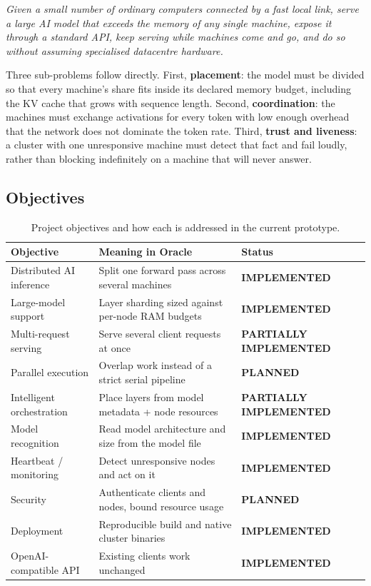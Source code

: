 \documentclass[11pt,a4paper]{article}
\newcommand{\stImp}{\textcolor{ogreen}{\footnotesize\textsf{\textbf{IMPLEMENTED}}}}
\newcommand{\stPart}{\textcolor{oamber}{\footnotesize\textsf{\textbf{PARTIALLY IMPLEMENTED}}}}
\newcommand{\stPlan}{\textcolor{oblue}{\footnotesize\textsf{\textbf{PLANNED}}}}
\begin{document}
\emph{Given a small number of ordinary computers connected by a fast local link,
serve a large AI model that exceeds the memory of any single machine, expose it
through a standard API, keep serving while machines come and go, and do so
without assuming specialised datacentre hardware.}

Three sub-problems follow directly. First, \textbf{placement}: the model must be
divided so that every machine's share fits inside its declared memory budget,
including the KV cache that grows with sequence length. Second,
\textbf{coordination}: the machines must exchange activations for every token
with low enough overhead that the network does not dominate the token rate.
Third, \textbf{trust and liveness}: a cluster with one unresponsive machine must
detect that fact and fail loudly, rather than blocking indefinitely on a machine
that will never answer.

\subsection{Objectives}

\begin{table}[h]
\centering
\caption{Project objectives and how each is addressed in the current prototype.}
\label{tab:objectives}
\footnotesize
\begin{tabularx}{\textwidth}{@{}l X l@{}}
\toprule
\textbf{Objective} & \textbf{Meaning in Oracle} & \textbf{Status} \\
\midrule
Distributed AI inference & Split one forward pass across several machines & \stImp \\
Large-model support & Layer sharding sized against per-node RAM budgets & \stImp \\
Multi-request serving & Serve several client requests at once & \stPart \\
Parallel execution & Overlap work instead of a strict serial pipeline & \stPlan \\
Intelligent orchestration & Place layers from model metadata + node resources & \stPart \\
Model recognition & Read model architecture and size from the model file & \stImp \\
Heartbeat / monitoring & Detect unresponsive nodes and act on it & \stImp \\
Security & Authenticate clients and nodes, bound resource usage & \stPlan \\
Deployment & Reproducible build and native cluster binaries & \stImp \\
OpenAI-compatible API & Existing clients work unchanged & \stImp \\
\bottomrule
\end{tabularx}
\end{table}
\end{document}
